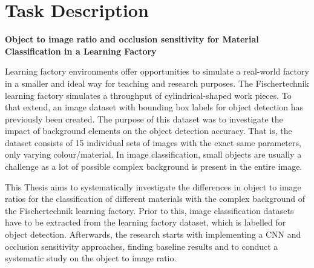 \chapter*{Task Description}
\vspace*{-1.5\baselineskip}

\begin{singlespace}
\small
\setlength{\parindent}{0pt}\setlength{\parskip}{2pt}
{\centering\large\bfseries Object to image ratio and occlusion sensitivity for Material
Classification in a Learning Factory\par}
\bigskip
{}\par\smallskip

Learning factory environments offer opportunities to simulate a real-world factory in a
smaller and ideal way for teaching and research purposes. The Fischertechnik learning
factory simulates a throughput of cylindrical-shaped work pieces. To that extend, an
image dataset with bounding box labels for object detection has previously been
created. The purpose of this dataset was to investigate the impact of background
elements on the object detection accuracy. That is, the dataset consists of 15
individual sets of images with the exact same parameters, only varying colour/material.
In image classification, small objects are usually a challenge as a lot of possible
complex background is present in the entire image.

\medskip
{}\par\smallskip

This Thesis aims to systematically investigate the differences in object to image ratios
for the classification of different materials with the complex background of the
Fischertechnik learning factory. Prior to this, image classification datasets have to be
extracted from the learning factory dataset, which is labelled for object detection.
Afterwards, the research starts with implementing a CNN and occlusion sensitivity
approaches, finding baseline results and to conduct a systematic study on the object to
image ratio.
\end{singlespace}
